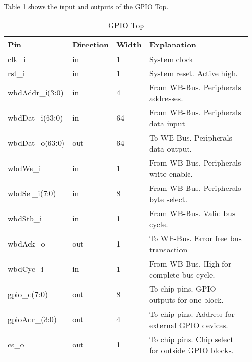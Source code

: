 
Table \ref{tab:asGpioPer06} shows the input and outputs of the GPIO Top.
\begin{table}[H]
\caption{GPIO Top}
\label{tab:asGpioPer06}
\centering
\begin{tabularx}{\textwidth}{|l |l |l |X|}
  \hline
  Pin & Direction & Width & Explanation \\
  \hline
  \hline
  clk\_i & in & 1 & System clock \\
  \hline
  rst\_i & in & 1 & System reset. Active high. \\
  \hline
  wbdAddr\_i(3:0) & in & 4 &  From WB-Bus. Peripherals addresses. \\
  \hline
  wbdDat\_i(63:0) & in & 64 &  From WB-Bus. Peripherals data input. \\
  \hline
  wbdDat\_o(63:0) & out & 64 &  To WB-Bus. Peripherals data output. \\
  \hline
  wbdWe\_i & in & 1 &  From WB-Bus. Peripherals write enable. \\
  \hline
  wbdSel\_i(7:0) & in & 8 &  From WB-Bus. Peripherals byte select. \\
  \hline
  wbdStb\_i & in & 1 &  From WB-Bus. Valid bus cycle.  \\
  \hline
  wbdAck\_o & out & 1 &  To WB-Bus. Error free bus transaction.  \\
  \hline
  wbdCyc\_i & in & 1 &  From WB-Bus. High for complete bus cycle.  \\
  \hline
  gpio\_o(7:0) & out & 8 &  To chip pins. GPIO outputs for one block. \\
  \hline
  gpioAdr\_(3:0) & out & 4 & To chip pins. Address for external GPIO devices. \\
  \hline
  cs\_o & out & 1 &  To chip pins. Chip select for outside GPIO blocks.   \\
  \hline
\end{tabularx}
\end{table}
